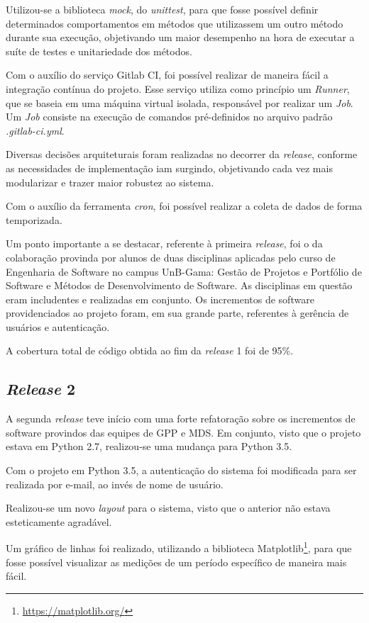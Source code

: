 Utilizou-se a biblioteca \textit{mock}, do \textit{unittest}, para que fosse possível definir determinados comportamentos em métodos que utilizassem um outro método durante sua execução, objetivando um maior desempenho na hora de executar a suíte de testes e unitariedade dos métodos.

Com o auxílio do serviço Gitlab CI, foi possível realizar de maneira fácil a integração contínua do projeto. Esse serviço utiliza como princípio um \textit{Runner}, que se baseia em uma máquina virtual isolada, responsável por realizar um \textit{Job}. Um \textit{Job} consiste na execução de comandos pré-definidos no arquivo padrão \textit{.gitlab-ci.yml}.

Diversas decisões arquiteturais foram realizadas no decorrer da \textit{release}, conforme as necessidades de implementação iam surgindo, objetivando cada vez mais modularizar e trazer maior robustez ao sistema.

Com o auxílio da ferramenta \textit{cron}, foi possível realizar a coleta de dados de forma temporizada.

Um ponto importante a se destacar, referente à primeira \textit{release}, foi o da colaboração provinda por alunos de duas disciplinas aplicadas pelo curso de Engenharia de Software no campus UnB-Gama: Gestão de Projetos e Portfólio de Software e Métodos de Desenvolvimento de Software. As disciplinas em questão eram includentes e realizadas em conjunto. Os incrementos de software providenciados ao projeto foram, em sua grande parte, referentes à gerência de usuários e autenticação.

A cobertura total de código obtida ao fim da \textit{release} 1 foi de 95\%.

\subsection{\textit{Release} 2}
A segunda \textit{release} teve início com uma forte refatoração sobre os incrementos de software provindos das equipes de GPP e MDS. Em conjunto, visto que o projeto estava em Python 2.7, realizou-se uma mudança para Python 3.5.

Com o projeto em Python 3.5, a autenticação do sistema foi modificada para ser realizada por e-mail, ao invés de nome de usuário.

Realizou-se um novo \textit{layout} para o sistema, visto que o anterior não estava esteticamente agradável.

Um gráfico de linhas foi realizado, utilizando a biblioteca Matplotlib\footnote{\url{https://matplotlib.org/}}, para que fosse possível visualizar as medições de um período específico de maneira mais fácil.

